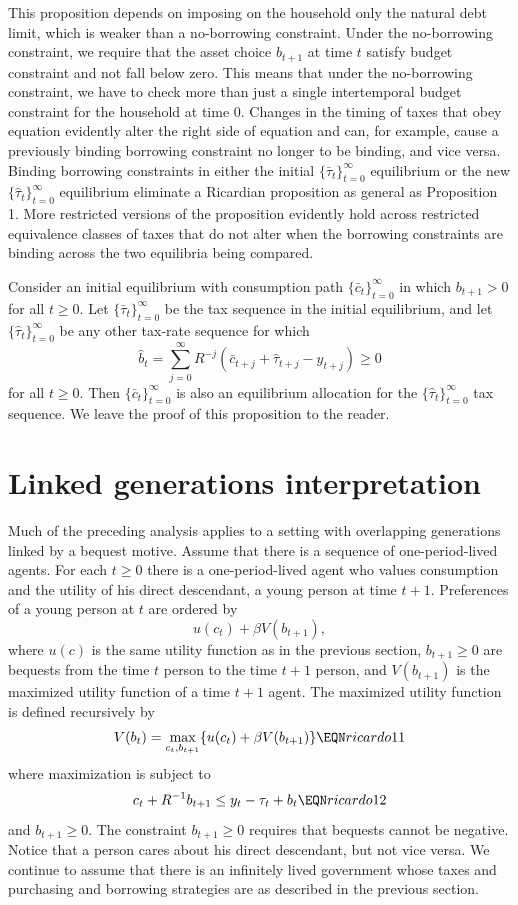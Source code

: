 \medskip

This proposition depends on imposing  on the household  only the natural debt limit,
which is weaker than a no-borrowing constraint.
Under the no-borrowing constraint, we require that the asset choice
$b_{t+1}$ at time $t$ satisfy budget constraint 
and  not fall below zero. This means that under the no-borrowing constraint,
we have to check more than just a single  intertemporal budget
constraint for the household at time $0$.
Changes in the timing of taxes that
obey equation  evidently alter the right side of
equation 
and can, for example, cause a previously binding
 borrowing constraint no longer
to  be binding, and  vice versa.
Binding borrowing constraints in either the initial
$\{\bar \tau_t\}_{t=0}^\infty$ equilibrium or the new $\{\hat \tau_t\}_{t=0}^\infty$ equilibrium eliminate
a Ricardian proposition as general as Proposition 1.
More restricted versions of the proposition evidently hold across restricted
equivalence classes of taxes that do not alter when the borrowing
constraints are binding
across the two equilibria being compared.


\medskip
{}  Consider an initial equilibrium
with consumption path $\{\bar c_t\}_{t=0}^\infty$
in which $b_{t+1} >0$ for all $t \geq 0$.  Let $\{\bar \tau_t \}_{t=0}^\infty$
be the tax   sequence in the initial equilibrium, and let
$\{\hat \tau_t\}_{t=0}^\infty$ be any other tax-rate sequence for which
$$ \hat b_t = \sum_{j=0}^\infty R^{-j} (\bar c_{t+j} +
\hat \tau_{t+j} - y_{t+j}) \geq 0 $$
for all $t \geq 0$.  Then
$\{\bar  c_t\}_{t=0}^\infty$ is also an equilibrium allocation
for the $\{\hat \tau_t\}_{t=0}^\infty$ tax sequence.
\medskip
We leave the proof of this proposition to the reader.

\section{Linked generations interpretation}
  Much of the
preceding analysis  applies to a setting
with overlapping generations linked by a bequest motive.
Assume that there is a sequence of  one-period-lived agents.
For each $t\geq 0$ there is a one-period-lived agent who
values consumption and the utility of his direct descendant, a young
person at time $t+1$.  Preferences of a young person at $t$ are
ordered by
$$  u(c_t)  + \beta V(b_{t+1}), $$
where $u(c)$ is the same utility function
as in the previous section,
$b_{t+1}\geq 0$  are bequests from the  time $t$   person to
the time $t+1$ person, and $V(b_{t+1})$ is the maximized utility
function of a time $t+1$ agent.   The maximized utility function
is defined recursively by
$$ V(b_t) =  \max_{c_t, b_{t+1}} \{u(c_t) + \beta V(b_{t+1}) \} \EQN ricardo11$$
where maximization is subject to
$$ c_t + R^{-1} b_{t+1} \leq y_t -\tau_t + b_t\EQN ricardo12$$
and $b_{t+1} \geq 0$.   The constraint $b_{t+1} \geq 0$ requires that
bequests cannot be negative.   Notice that a person cares about
his direct descendant, but not vice versa.
We continue to assume that there is an infinitely lived government
whose taxes and purchasing and borrowing strategies are as described in
the previous section.

